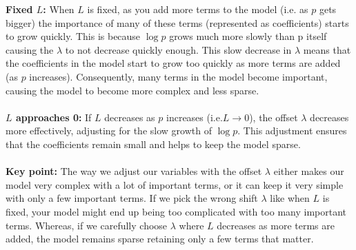 \textbf{Fixed $L$:} When $L$ is fixed, as you add more terms to the model (i.e. as $p$ gets bigger) the importance of many of these terms (represented as coefficients) starts to grow quickly. This is because $\log p$ grows much more slowly than p itself causing the $\lambda$ to not decrease quickly enough. This slow decrease in $\lambda$ means that the coefficients in the model start to grow too quickly as more terms are added (as $p$ increases). Consequently, many terms in the model become important, causing the model to become more complex and less sparse.\\ 
\\
\textbf{$L$ approaches 0:} If $L$ decreases as $p$ increases (i.e.$L \rightarrow 0$), the offset $\lambda$ decreases more effectively, adjusting for the slow growth of $\log p$. This adjustment ensures that the coefficients remain small and helps to keep the model sparse. \\
\\
\textbf{Key point:} The way we adjust our variables with the offset $\lambda$ either makes our model very complex with a lot of important terms, or it can keep it very simple with only a few important terms. If we pick the wrong shift $\lambda$ like when $L$ is fixed, your model might end up being too complicated with too many important terms. Whereas, if we carefully choose $\lambda$ where $L$ decreases as more terms are added, the model remains sparse retaining only a few terms that matter.

